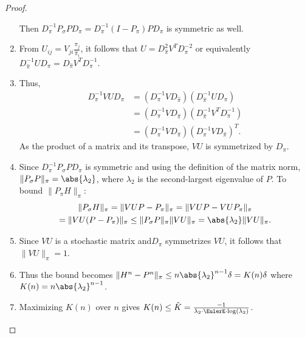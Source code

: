 \documentclass[12pt]{article}
\begin{document}
\begin{proof}
\begin{enumerate}
            Then \( D_{\pi}^{-1} P_{\sigma} P D_{\pi} = D_{\pi}^{-1} (I-P_
            {\pi}) P D_{\pi} \) is symmetric as well.
        \item \label{item:lumpedchains:steptwelve}
            From \( U_{ij} = V_{ji} \frac{\pi_j}{\hat{\pi}_{i}} \), it
            follows that \( U = D_{\hat{\pi}}^2 V^T D_{\pi}^{-2} \) or
            equivalently \( D_{\hat{\pi}}^{-1} U D_{\pi} = D_{\hat{\pi}}
            V^T D_{\pi}^{-1} \).
        \item \label{item:lumpedchains:stepthirteen}
            Thus,
            \begin{align*}
                D_{\pi}^{-1} VU D_{\pi} &= (D_{\pi}^{-1} V D_{\hat{\pi}})
                (D_{\hat{\pi}}^{-1} U D_{\pi}) \\
                &= (D_{\pi}^{-1} V D_{\hat{\pi}})(D_{\hat{\pi}}^{-1} V^T
                D_{\pi}^{-1}) \\
                &= (D_{\pi}^{-1} V D_{\hat{\pi}})(D_{\pi}^{-1} V D_{\hat
                {\pi}})^T.
            \end{align*}
            As the product of a matrix and its transpose, \( VU \) is
            symmetrized by \( D_{\pi} \).
        \item
            Since \( D_{\pi}^{-1} P_{\sigma} P D_{\pi} \) is symmetric
            and using the definition of the matrix norm, \( \| P_{\sigma}
            P \|_{\pi} = \abs{\lambda_2} \), where \( \lambda_2 \) is
            the second-largest eigenvalue of \( P \).  To bound \( \| P_
            {\pi} H \|_{\pi} \):
            \begin{multline*}
                \| P_{\sigma} H \|_{\pi} = \| VUP - P_{\pi} \|_{\pi}
                = \| VUP - VUP_{\pi}\|_{\pi} \\
                = \| VU(P - P_{\pi})\|_{\pi} \le \|P_{\sigma} P\|_{\pi}
                \|VU\|_{\pi} = \abs{\lambda_2} \|VU\|_{\pi}.
            \end{multline*}
        \item
            Since \( VU \) is a stochastic matrix and\( D_{\pi} \)
            symmetrizes \( VU \), it follows that \( \| VU \|_{\pi} = 1 \).
        \item
            Thus the bound becomes \( \| H^n - P^n\|_{\pi} \le n \abs{\lambda_2}^
            {n-1} \delta = K(n) \delta \) where \( K(n) = n \abs{\lambda_2}^
            {n-1} \).
        \item
            Maximizing \( K(n) \) over \( n \) gives \( K(n) \le \hat{K}
            = \frac{-1}{\lambda_2 \cdot \EulerE \cdot \log(\lambda_2)} \).
    \end{enumerate}
  \end{proof}
\end{document}
